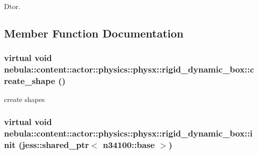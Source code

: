 Dtor. 

\subsection{Member Function Documentation}
\hypertarget{classnebula_1_1content_1_1actor_1_1physics_1_1physx_1_1rigid__dynamic__box_a2f7f5578f4651247e1440338b372438b}{
\subsubsection[{create\_\-shape}]{\setlength{\rightskip}{0pt plus 5cm}virtual void nebula::content::actor::physics::physx::rigid\_\-dynamic\_\-box::create\_\-shape ()}}
\label{classnebula_1_1content_1_1actor_1_1physics_1_1physx_1_1rigid__dynamic__box_a2f7f5578f4651247e1440338b372438b}


create shapes \hypertarget{classnebula_1_1content_1_1actor_1_1physics_1_1physx_1_1rigid__dynamic__box_a6e2234156648244b1b49d3028f0855e2}{
\subsubsection[{init}]{\setlength{\rightskip}{0pt plus 5cm}virtual void nebula::content::actor::physics::physx::rigid\_\-dynamic\_\-box::init (jess::shared\_\-ptr$<$ {\bf n34100::base} $>$)}}
\label{classnebula_1_1content_1_1actor_1_1physics_1_1physx_1_1rigid__dynamic__box_a6e2234156648244b1b49d3028f0855e2}


